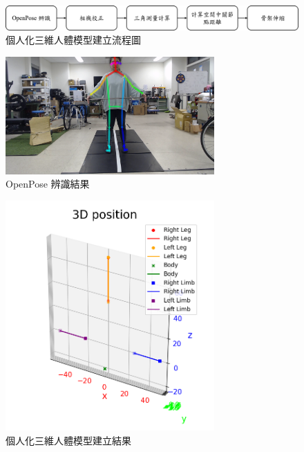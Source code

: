 \begin{figure}[!ht]
   \centering
   \includegraphics[width=\linewidth]{figure/ch3_fig_skeleton_flow.png}
    \caption[個人化三維人體模型建立流程圖]{個人化三維人體模型建立流程圖}
    \label{ch3_fig_skeleton_flow}
\end{figure}

\begin{figure}[!ht]
   \centering
   \includegraphics[width=8cm]{figure/ch3_fig_OpenPose_result.png}
   \caption[OpenPose 辨識結果]{OpenPose 辨識結果}
   \label{ch3_fig_OpenPose_result}
\end{figure}

\begin{figure}[!ht]
   \centering
   \includegraphics[width=8cm]{figure/ch3_fig_my_skeleton.png}
   \caption[個人化三維人體模型建立結果]{個人化三維人體模型建立結果}
   \label{ch3_fig_my_skeleton}
\end{figure}

